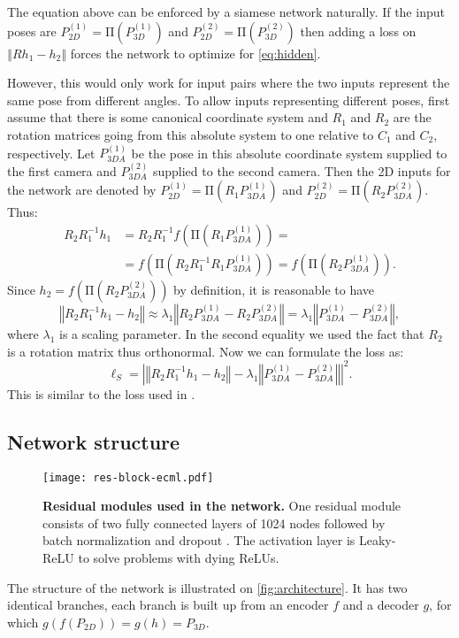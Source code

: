 \documentclass[preprint]{elsarticle}
\begin{document}
The equation above can be enforced by a siamese network naturally. If the input poses are $P_{2D}^{(1)}=\mathrm{\Pi} \left(P_{3D}^{(1)}\right)$ and $P_{2D}^{(2)}=\mathrm{\Pi} \left(P_{3D}^{(2)}\right)$ then adding a loss on $\left\Vert Rh_1-h_2\right\Vert$ forces the network to optimize for \autoref{eq:hidden}. 

However, this would only work for input pairs where the two inputs represent the same pose from different angles. To allow inputs representing different poses, first assume that there is some canonical coordinate system and $R_1$ and $R_2$ are the rotation matrices going from this absolute system to one relative to $C_1$ and $C_2$, respectively. Let $P_{3DA}^{(1)}$ be the pose in this absolute coordinate system supplied to the first camera and $P_{3DA}^{(2)}$ supplied to the second camera. Then the 2D inputs for the network are denoted by $P_{2D}^{(1)}=\mathrm{\Pi} \left(R_1P_{3DA}^{(1)}\right)$ and $P_{2D}^{(2)}=\mathrm{\Pi} \left(R_2P_{3DA}^{(2)}\right)$. Thus:
\begin{equation*}
\begin{split}
    R_2R_1^{-1}h_1&=R_2R_1^{-1}f\left(\mathrm{\Pi} \left(R_1P_{3DA}^{(1)}\right)\right)= \\
   & =f\left(\mathrm{\Pi} \left(R_2R_1^{-1}R_1P_{3DA}^{(1)}\right)\right)=f\left(\mathrm{\Pi} \left(R_2P_{3DA}^{(1)}\right)\right).
\end{split}
\end{equation*}
Since $h_2=f\left(\mathrm{\Pi} \left(R_2P_{3DA}^{(2)}\right)\right)$ by definition,  it is reasonable to have 
$$\left\Vert R_2R_1^{-1}h_1-h_2\right\Vert\approx\lambda_1\left\Vert R_2P_{3DA}^{(1)}-R_2P_{3DA}^{(2)}\right\Vert=\lambda_1\left\Vert P_{3DA}^{(1)}-P_{3DA}^{(2)}\right\Vert,$$
where $\lambda_1$ is a scaling parameter. In the second equality we used the fact that $R_2$ is a rotation matrix thus orthonormal. Now we can formulate the loss as:
\begin{equation}
\label{eq:siam_loss}
    \ell_S=\left|\left\Vert R_2R_1^{-1}h_1-h_2\right\Vert-\lambda_1\left\Vert P_{3DA}^{(1)}-P_{3DA}^{(2)}\right\Vert\right|^2.
\end{equation}
This is similar to the loss used in \cite{doumanoglouSiamesePose,siamese_headpose}.


\subsection{Network structure}
\begin{figure}[ht]
    \centering
    \texttt{[image: res-block-ecml.pdf]}
    \caption{\textbf{Residual modules used in the network.} One residual module consists of two fully connected layers of 1024 nodes followed by batch normalization \cite{batchnorm} and dropout \cite{dropout}. The activation layer is Leaky-ReLU to solve problems with dying ReLUs.}
    \label{fig:res-block}
\end{figure}
The structure of the network is illustrated on \autoref{fig:architecture}. It has two identical branches, each branch is built up from an encoder $f$ and a decoder $g$, for which $g(f(P_{2D}))=g(h)=P_{3D}$.
\end{document}
